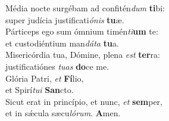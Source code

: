 \evenverse Média nocte surgébam ad confitén\textit{dum} \textbf{ti}bi:~\*\\
\evenverse super judícia justificati\textit{ó}\textit{nis} \textbf{tu}æ.\\
\oddverse Párticeps ego sum ómnium timén\textit{ti}\textbf{um} te:~\*\\
\oddverse et custodiéntium man\textit{dá}\textit{ta} \textbf{tu}a.\\
\evenverse Misericórdia tua, Dómine, plena \textit{est} \textbf{ter}ra:~\*\\
\evenverse justificatiónes \textit{tu}\textit{as} \textbf{do}ce me.\\
\oddverse Glória Patri, \textit{et} \textbf{Fí}lio,~\*\\
\oddverse et Spirí\textit{tu}\textit{i} \textbf{San}cto.\\
\evenverse Sicut erat in princípio, et nunc, \textit{et} \textbf{sem}per,~\*\\
\evenverse et in sǽcula sæcu\textit{ló}\textit{rum}. \textbf{A}men.\\
